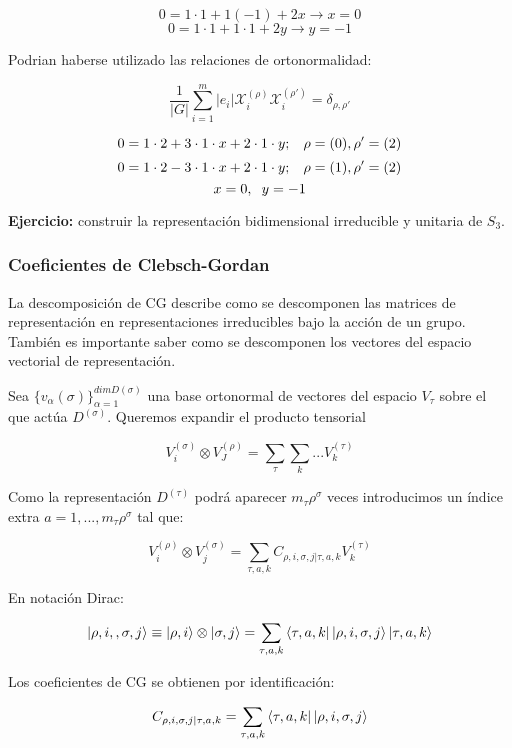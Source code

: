 \begin{itemize}
$$0=1\cdot 1+1(-1)+ 2x \to x=0$$
$$0=1\cdot 1+1\cdot 1 +2y \to y=-1$$

Podrian haberse utilizado las relaciones de ortonormalidad:

$$\frac{1}{|G|}\sum _{i=1}^m |e_i|\mathcal{X}_i^{(\rho)}\mathcal{X}_i^{(\rho ')}=\delta _{\rho , \rho '}$$

$$0=1\cdot 2+3\cdot 1\cdot x+2\cdot 1\cdot y; \hspace{0.3cm} \rho =(0), \rho '=(2)$$
$$0=1\cdot 2-3\cdot 1\cdot x +2 \cdot 1\cdot y; \hspace{0.3cm} \rho =(1),\rho '=(2)$$
$$x=0, \hspace{0.2cm} y=-1$$
\end{itemize}

\textbf{Ejercicio:} construir la representación bidimensional irreducible y unitaria de $S_3$.

\newpage

\subsubsection{Coeficientes de Clebsch-Gordan}
La descomposición de CG describe como se descomponen las matrices de representación en representaciones irreducibles bajo la acción de un grupo. También es importante saber como se descomponen los vectores del espacio vectorial de representación.

Sea $\lbrace v_\alpha (\sigma)\rbrace^{dim D(\sigma)}_{\alpha =1}$ una base ortonormal de vectores del espacio $V_\tau$ sobre el que actúa $D^{(\sigma)}$. Queremos expandir el producto tensorial

$$V_i^{(\sigma)}\otimes V_J^{(\rho)}=\sum _\tau \sum _k ...V_k^{(\tau)}$$

Como la representación $D^{(\tau)}$ podrá aparecer $m_\tau \rho ^\sigma$ veces introducimos un índice extra $a=1,..., m_\tau \rho ^\sigma$ tal que:

$$V_i^{(\rho)}\otimes V_j^{(\sigma)}=\sum _{\tau , a, k}C_{\rho , i, \sigma, j | \tau, a, k}V_k^{(\tau)}$$

En notación Dirac:

$$\ket{\rho, i, ,\sigma , j}\equiv \ket{\rho, i} \otimes \ket{\sigma , j}=\sum _{\tau , a,k}\bra{\tau , a, k}\ket{\rho, i,  \sigma ,j } \ket{\tau , a, k}$$

Los coeficientes de CG se obtienen por identificación:

$$C_{\rho , i, \sigma, j | \tau, a, k}=\sum_{\tau , a,k}\bra{\tau , a, k}\ket{\rho, i,  \sigma ,j } $$


